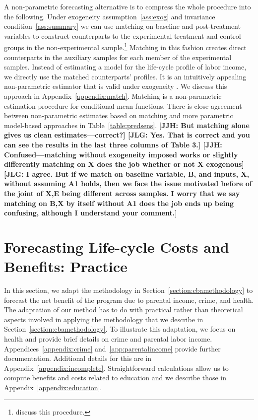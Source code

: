 A non-parametric forecasting alternative is to compress the whole procedure into the following. Under exogeneity assumption~\ref{ass:exog} and invariance condition~\ref{ass:summary} we can use matching on baseline and post-treatment variables to construct counterparts to the experimental treatment and control groups in the non-experimental sample.\footnote{\citet{Heckman_Ichimura_etal_1998_Econometrica} discuss this procedure.} Matching in this fashion creates direct counterparts in the auxiliary samples for each member of the experimental samples. Instead of estimating a model for the life-cycle profile of labor income, we directly use the matched counterparts' profiles. It is an intuitively appealing non-parametric estimator that is valid under exogeneity \citep{Heckman_Navarro_2004_REStat}. We discuss this approach in Appendix~\ref{appendix:match}. Matching is a non-parametric estimation procedure for conditional mean functions. There is close agreement between non-parametric estimates based on matching and more parametric model-based approaches in Table~\ref{table:predsens}. \textbf{[JJH: But matching alone gives us clean estimates---correct?] [JLG: Yes. That is correct and you can see the results in the last three columns of Table 3.] [JJH: Confused---matching without exogeneity imposed works or slightly differently matching on X does the job whether or not X exogenous] [JLG: I agree. But if we match on baseline variable, B, and inputs, X,  without assuming A1 holds, then we face the issue motivated before of the joint of X,E being different across samples. I worry that we say matching on B,X by itself without A1 does the job ends up being confusing, although I understand your comment.]}

\section{Forecasting Life-cycle Costs and Benefits: Practice} \label{section:cbapractice}

In this section, we adapt the methodology in Section~\ref{section:cbamethodology} to forecast the net benefit of the program due to parental income, crime, and health. The adaptation of our method has to do with practical rather than theoretical aspects involved in applying the methodology that we describe in Section~\ref{section:cbamethodology}. To illustrate this adaptation, we focus on health and provide brief details on crime and parental labor income. Appendices~\ref{appendix:crime} and~\ref{app:parentalincome} provide further documentation. Additional details for this are in Appendix~\ref{appendix:incomplete}. Straightforward calculations allow us to compute benefits and costs related to education and we describe those in Appendix~\ref{appendix:education}.

